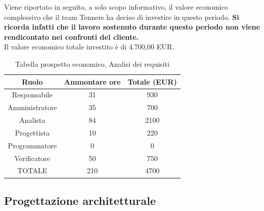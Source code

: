 \noindent Viene riportato in seguito, a solo scopo informativo, il valore economico complessivo che il team Tenners ha deciso di investire in questo periodo.
\noindent \textbf{Si ricorda infatti che il lavoro sostenuto durante questo periodo non viene rendicontato nei confronti del cliente.} \\
Il valore economico totale investito è di 4.700,00 EUR.
\begin{table}[h]
	\caption{Tabella prospetto economico, Analisi dei requisiti}
\begin{center}
\begin{tabular}{ |c|c|c|  }
 \hline
 Ruolo 		& Ammontare ore 	& Totale (EUR)\\
 	\hline
 \hline
 	Responsabile	& 31 	& 930\\
	Amministratore	& 35		& 700\\
	Analista		& 84 	& 2100\\
	Progettista		& 10		& 220\\
	Programmatore	& 0		& 0\\
	Verificatore	& 50		& 750\\
 \hline\hline
 TOTALE		& 210		& 4700\\
  \hline
\end{tabular}
\end{center}
\end{table}
\newpage
\subsection{Progettazione architetturale}
